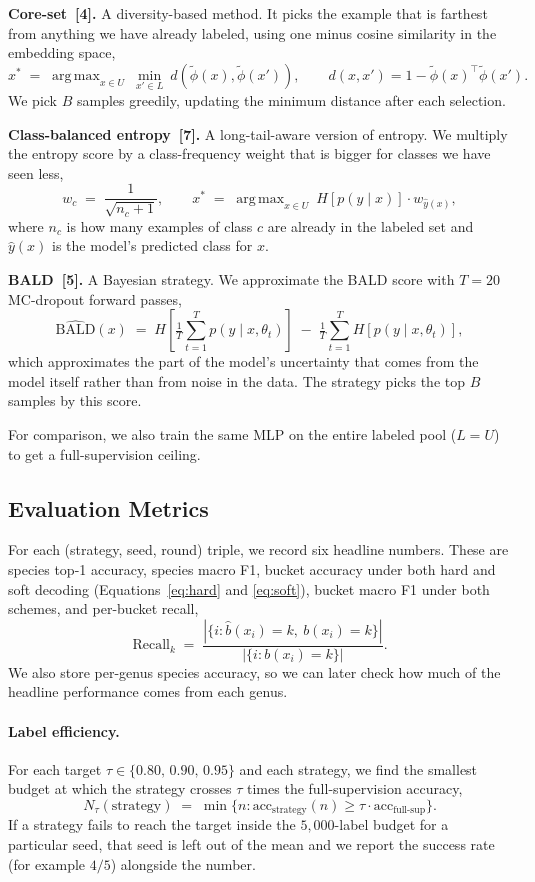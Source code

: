 \documentclass[11pt]{article}
\DeclareMathOperator*{\argmax}{arg\,max}
\begin{document}
\textbf{Core-set~[4].} A diversity-based method. It picks the example that
is farthest from anything we have already labeled, using one minus cosine
similarity in the embedding space,
\[
x^{*} \;=\; \argmax_{x \in U}\ \min_{x' \in L}\ d(\tilde\phi(x), \tilde\phi(x')),
\qquad
d(x, x') = 1 - \tilde\phi(x)^{\top} \tilde\phi(x').
\]
We pick $B$ samples greedily, updating the minimum distance after each
selection.

\textbf{Class-balanced entropy~[7].} A long-tail-aware version of entropy.
We multiply the entropy score by a class-frequency weight that is bigger for
classes we have seen less,
\[
w_c \;=\; \frac{1}{\sqrt{n_c + 1}},
\qquad
x^{*} \;=\; \argmax_{x \in U}\ H[p(y \mid x)] \cdot w_{\hat y(x)},
\]
where $n_c$ is how many examples of class $c$ are already in the labeled
set and $\hat y(x)$ is the model's predicted class for $x$.

\textbf{BALD~[5].} A Bayesian strategy. We approximate the BALD score
with $T = 20$ MC-dropout forward passes,
\[
\widehat{\text{BALD}}(x)
\;=\; H\!\left[\tfrac{1}{T} \sum_{t=1}^{T} p(y \mid x, \theta_t)\right]
\;-\; \tfrac{1}{T} \sum_{t=1}^{T} H\!\left[p(y \mid x, \theta_t)\right],
\]
which approximates the part of the model's uncertainty that comes from the
model itself rather than from noise in the data. The strategy picks the
top $B$ samples by this score.

For comparison, we also train the same MLP on the entire labeled pool
($L = U$) to get a full-supervision ceiling.

\subsection{Evaluation Metrics}

For each (strategy, seed, round) triple, we record six headline numbers.
These are species top-1 accuracy, species macro F1, bucket accuracy under
both hard and soft decoding (Equations~\eqref{eq:hard} and \eqref{eq:soft}),
bucket macro F1 under both schemes, and per-bucket recall,
\[
\text{Recall}_k \;=\;
\frac{|\{i : \hat b(x_i) = k,\ b(x_i) = k\}|}
     {|\{i : b(x_i) = k\}|}.
\]
We also store per-genus species accuracy, so we can later check how much of
the headline performance comes from each genus.

\paragraph{Label efficiency.} For each target $\tau \in \{0.80,\,0.90,\,0.95\}$
and each strategy, we find the smallest budget at which the strategy crosses
$\tau$ times the full-supervision accuracy,
\[
N_\tau(\text{strategy}) \;=\; \min\bigl\{n :
\text{acc}_{\text{strategy}}(n) \ge \tau \cdot \text{acc}_{\text{full-sup}}\bigr\}.
\]
If a strategy fails to reach the target inside the $5{,}000$-label budget
for a particular seed, that seed is left out of the mean and we report the
success rate (for example $4/5$) alongside the number.
\end{document}

